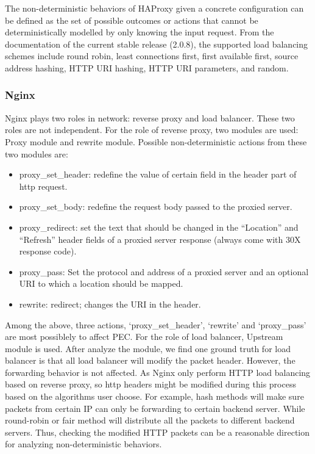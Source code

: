 The non-deterministic behaviors of HAProxy given a concrete configuration can be
defined as the set of possible outcomes or actions that cannot be
deterministically modelled by only knowing the input request. From the
documentation of the current stable release (2.0.8), the supported load
balancing schemes include round robin, least connections first, first available
first, source address hashing, HTTP URI hashing, HTTP URI parameters, and
random.

\subsubsection{Nginx}

Nginx plays two roles in network: reverse proxy and load balancer.  These two
roles are not independent.  For the role of reverse proxy, two modules are used:
\ca Proxy module and \cb rewrite module.  Possible non-deterministic actions
from these two modules are:
\begin{itemize}
    \item proxy\_set\_header: redefine the value of certain field in the header
        part of http request.
    \item proxy\_set\_body: redefine the request body passed to the proxied
        server.
    \item proxy\_redirect: set the text that should be changed in the “Location”
        and “Refresh” header fields of a proxied server response (always come
        with 30X response code).
    \item proxy\_pass: Set the protocol and address of a proxied server and an
        optional URI to which a location should be mapped.
	\item rewrite: redirect; changes the URI in the header.
\end{itemize}

Among the above, three actions, `proxy\_set\_header', `rewrite' and
`proxy\_pass' are most possiblely to affect PEC.  For the role of load balancer,
Upstream module is used.  After analyze the module, we find one ground truth for
load balancer is that all load balancer will modify the packet header.  However,
the forwarding behavior is not affected.  As Nginx only perform HTTP load
balancing based on reverse proxy, so http headers might be modified during this
process based on the algorithms user choose.  For example, hash methods will
make sure packets from certain IP can only be forwarding to certain backend
server.  While round-robin or fair method will distribute all the packets to
different backend servers.  Thus, checking the modified HTTP packets can be a
reasonable direction for analyzing non-deterministic behaviors.

